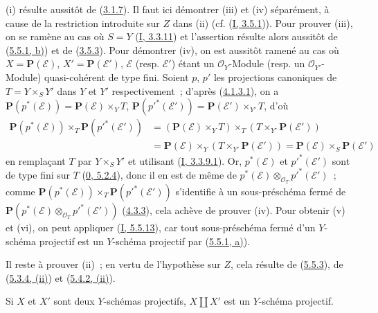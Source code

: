 (i) résulte aussitôt de (\hyperref[II.3.1.7-fr]{3.1.7}). Il faut ici
démontrer (iii) et (iv) séparément, à cause de la restriction introduite sur
$Z$ dans (ii) (cf. (\hyperref[I.3.5.1-fr]{I, 3.5.1})). Pour prouver (iii), on
se ramène au cas où $S=Y$ (\hyperref[I.3.3.11-fr]{I, 3.3.11}) et l'assertion
résulte alors aussitôt de (\hyperref[II.5.5.1-fr]{5.5.1, b)}) et de
(\hyperref[II.3.5.3-fr]{3.5.3}). Pour démontrer (iv), on est aussitôt ramené
au cas où $X=\mathbf{P}(\mathcal{E})$, $X'=\mathbf{P}(\mathcal{E}')$,
$\mathcal{E}$ (resp. $\mathcal{E}'$) étant un $\mathcal{O}_Y$-Module (resp.
un $\mathcal{O}_{Y'}$-Module) quasi-cohérent de type fini. Soient $p$, $p'$ les
projections canoniques de $T=Y\times_SY'$ dans $Y$ et $Y'$ respectivement~;
d'après (\hyperref[II.4.1.3.1-fr]{4.1.3.1}), on a
$\mathbf{P}(p^*(\mathcal{E}))=\mathbf{P}(\mathcal{E})\times_YT$,
$\mathbf{P}(p'^*(\mathcal{E}'))=\mathbf{P}(\mathcal{E}')\times_{Y'}T$, d'où
\begin{align*}
\mathbf{P}(p^*(\mathcal{E}))\times_T\mathbf{P}(p'^*(\mathcal{E}'))
&=(\mathbf{P}(\mathcal{E})\times_YT)\times_T
(T\times_{Y'}\mathbf{P}(\mathcal{E}'))\\
&=\mathbf{P}(\mathcal{E})\times_Y
(T\times_{Y'}\mathbf{P}(\mathcal{E}'))
=\mathbf{P}(\mathcal{E})\times_S\mathbf{P}(\mathcal{E}')
\end{align*}
en remplaçant $T$ par $Y\times_SY'$ et utilisant
(\hyperref[I.3.3.9.1-fr]{I, 3.3.9.1}). Or, $p^*(\mathcal{E})$ et
$p'^*(\mathcal{E}')$ sont de type fini sur $T$
(\hyperref[0.5.2.4-fr]{0, 5.2.4}), donc il en est de même de
$p^*(\mathcal{E})\otimes_{\mathcal{O}_T}p'^*(\mathcal{E}')$~; comme
$\mathbf{P}(p^*(\mathcal{E}))\times_T\mathbf{P}(p'^*(\mathcal{E}'))$
s'identifie à un sous-préschéma fermé de
$\mathbf{P}(p^*(\mathcal{E})\otimes_{\mathcal{O}_T}p'^*(\mathcal{E}'))$
(\hyperref[II.4.3.3-fr]{4.3.3}), cela achève de prouver (iv). Pour obtenir (v)
et (vi), on peut appliquer (\hyperref[I.5.5.13-fr]{I, 5.5.13}), car tout
sous-préschéma fermé d'un $Y$-schéma projectif est un $Y$-schéma projectif par
(\hyperref[II.5.5.1-fr]{5.5.1, a)}).

Il reste à prouver (ii)~; en vertu de l'hypothèse sur $Z$, cela résulte de
(\hyperref[II.5.5.3-fr]{5.5.3}), de
(\hyperref[II.5.3.4-fr]{5.3.4, (ii)}) et
(\hyperref[II.5.4.2-fr]{5.4.2, (ii)}).

\begin{proposition}[5.5.6]
\label{II.5.5.6-fr}
Si $X$ et $X'$ sont deux $Y$-schémas projectifs, $X\amalg X'$ est un
$Y$-schéma projectif.
\end{proposition}

